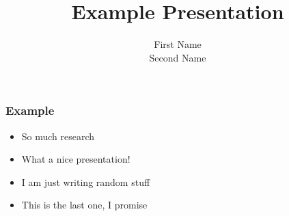 \documentclass{beamer}
\author{First Name \\
	Second Name}
\institute{Uppsala University\\Department of Information Technology}
\title{Example Presentation}
\begin{document}
\begin{frame}[plain]
	\titlepage
\end{frame}

\begin{frame}
	\frametitle{Example}
	\begin{itemize}
		\setlength\itemsep{0.5cm}
		\item So much research
		\item What a nice presentation!
		\item I am just writing random stuff
		\item This is the last one, I promise
	\end{itemize}
\end{frame}
\end{document}
